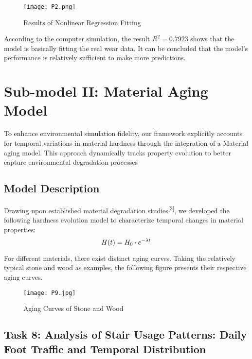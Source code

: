 \documentclass{mcmthesis}
\begin{document}
\begin{figure}[h] %
    \centering
    \texttt{[image: P2.png]} %
    \caption{Results of Nonlinear Regression Fitting}
    \label{fig:nonlinear_fit}
\end{figure}

According to the computer simulation, the result \( R^2 = 0.7923 \) shows that the model is basically fitting the real wear data. It can be concluded that the model's performance is relatively sufficient to make more predictions.


\section{Sub-model II: Material Aging Model}
\hspace{1.5em}To enhance environmental simulation fidelity, our framework explicitly accounts for temporal variations in material hardness through the integration of a Material aging model. This approach dynamically tracks property evolution to better capture environmental degradation processes
\subsection{Model Description}
\hspace{1.5em}Drawing upon established material degradation studies\textsuperscript{[3]}, we developed the following hardness evolution model to characterize temporal changes in material properties:
\begin{equation}
\label{eq9}
\hfill H(t) = H_0 \cdot e^{-\lambda t}
\end{equation}

For different materials, there exist distinct aging curves. Taking the relatively typical stone and wood as examples, the following figure presents their respective aging curves.

\begin{figure}[htp]
    \centering
    \texttt{[image: P9.jpg]}
    \caption{Aging Curves of Stone and Wood}
\end{figure}

\subsection{Task 8: Analysis of Stair Usage Patterns: Daily Foot Traffic and Temporal Distribution}
\end{document}
